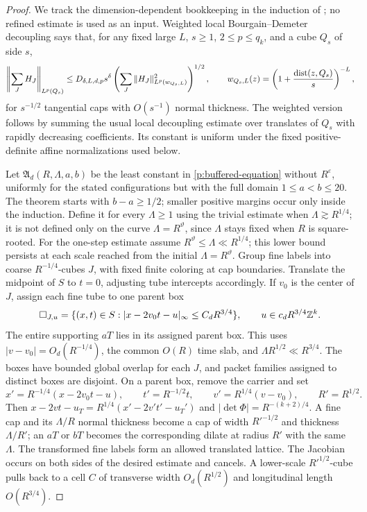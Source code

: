 \begin{proof}
We track the dimension-dependent bookkeeping in the induction of
\citet[Appendix~A]{SinghSinghParmar2026}; no refined estimate is used as
an input.  Weighted local Bourgain--Demeter decoupling says that, for any
fixed large $L$, $s\geq1$, $2\leq p\leq q_k$, and a cube $Q_s$ of side $s$,
\begin{equation}\label{p:bd-local}
 \left\|\sum_J H_J\right\|_{L^p(Q_s)}
 \leq D_{\delta,L,d,p}s^\delta
 \left(\sum_J\|H_J\|_{L^p(w_{Q_s,L})}^2\right)^{1/2},\qquad
 w_{Q_s,L}(z)=\left(1+\frac{\operatorname{dist}(z,Q_s)}s\right)^{-L},
\end{equation}
for $s^{-1/2}$ tangential caps with $O(s^{-1})$ normal thickness.  The
weighted version follows by summing the usual local decoupling estimate
over translates of $Q_s$ with rapidly decreasing coefficients.  Its
constant is uniform under the fixed positive-definite affine
normalizations used below.

Let $\mathfrak A_d(R,\Lambda,a,b)$ be the least constant in
\eqref{p:buffered-equation} without $R^\varepsilon$, uniformly for the
stated configurations but with the full domain $1\leq a<b\leq20$.
The theorem starts with $b-a\geq1/2$; smaller positive margins occur
only inside the induction.  Define it for every $\Lambda\geq1$ using the
trivial estimate when $\Lambda\gtrsim R^{1/4}$; it is not defined only
on the curve $\Lambda=R^\vartheta$, since $\Lambda$ stays fixed when $R$
is square-rooted.  For the one-step estimate assume
$R^\vartheta\leq\Lambda\ll R^{1/4}$; this lower bound persists at each
scale reached from the initial $\Lambda=R^\vartheta$.  Group fine labels
into coarse $R^{-1/4}$-cubes $J$, with fixed finite coloring at cap
boundaries.  Translate the midpoint of $S$ to $t=0$, adjusting tube
intercepts accordingly.  If $v_0$ is the center of $J$, assign each fine tube to one
parent box
\[
 \Box_{J,u}=\{(x,t)\in S:
       |x-2v_0t-u|_\infty\leq C_dR^{3/4}\},
 \qquad u\in c_dR^{3/4}\mathbb Z^k.
\]
The entire supporting $aT$ lies in its assigned parent box.  This uses
$|v-v_0|=O_d(R^{-1/4})$, the common $O(R)$ time slab, and
$\Lambda R^{1/2}\ll R^{3/4}$.  The boxes have bounded global overlap for
each $J$, and packet families assigned to distinct boxes are disjoint.
On a parent box, remove the carrier and set
\[
 x'=R^{-1/4}(x-2v_0t-u),\qquad t'=R^{-1/2}t,\qquad
 v'=R^{1/4}(v-v_0),\qquad R'=R^{1/2}.
\]
Then $x-2vt-u_T=R^{1/4}(x'-2v't'-u_T')$ and
$|\det\Phi|=R^{-(k+2)/4}$.  A fine cap and its $\Lambda/R$ normal
thickness become a cap of width $R'^{-1/2}$ and thickness $\Lambda/R'$;
an $aT$ or $bT$ becomes the corresponding dilate at radius $R'$ with the
same $\Lambda$.  The transformed fine labels form an allowed translated
lattice.  The Jacobian occurs on both sides of the desired estimate and
cancels.  A lower-scale $R'^{1/2}$-cube pulls back to a cell $C$ of
transverse width $O_d(R^{1/2})$ and longitudinal length $O(R^{3/4})$.


\end{proof}
